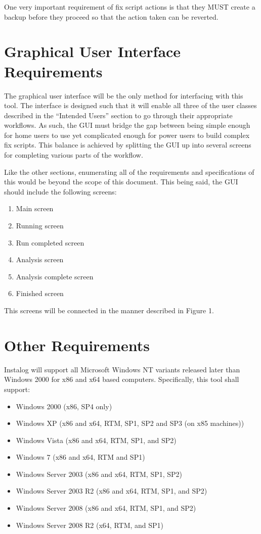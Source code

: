\documentclass[letterpaper,12pt]{article}
\begin{document}
One very important requirement of fix script actions is that they MUST create a
backup before they proceed so that the action taken can be reverted.  

\newpage



\section{Graphical User Interface Requirements}
The graphical user interface will be the only method for interfacing with this
tool.  The interface is designed such that it will enable all three of the user
classes described in the ``Intended Users'' section to go through their
appropriate workflows.  As such, the GUI must bridge the gap between being
simple enough for home users to use yet complicated enough for power users to
build complex fix scripts.  This balance is achieved by splitting the GUI up
into several screens for completing various parts of the workflow.

Like the other sections, enumerating all of the requirements and specifications
of this would be beyond the scope of this document.  This being said, the GUI
should include the following screens:

\begin{enumerate}
  \item Main screen
  \item Running screen
  \item Run completed screen
  \item Analysis screen
  \item Analysis complete screen
  \item Finished screen
\end{enumerate}

This screens will be connected in the manner described in Figure 1.

\newpage



\section{Other Requirements}
Instalog will support all Microsoft Windows NT variants released later than
Windows 2000 for x86 and x64 based computers.  Specifically, this tool shall
support:
\begin{itemize}
  \item Windows 2000 (x86, SP4 only)
  \item Windows XP (x86 and x64, RTM, SP1, SP2 and SP3 (on x85 machines))
  \item Windows Vista (x86 and x64, RTM, SP1, and SP2)
  \item Windows 7 (x86 and x64, RTM and SP1)
  \item Windows Server 2003 (x86 and x64, RTM, SP1, SP2)
  \item Windows Server 2003 R2 (x86 and x64, RTM, SP1, and SP2)
  \item Windows Server 2008 (x86 and x64, RTM, SP1, and SP2)
  \item Windows Server 2008 R2 (x64, RTM, and SP1)
\end{itemize}

\newpage
\end{document}
